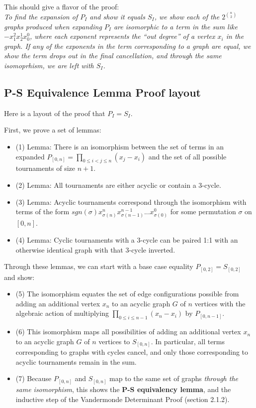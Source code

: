 \documentclass[11pt, oneside]{article} 	%
\begin{document}
This should give a flavor of the proof: 
\\
\emph{To find the expansion of $P_I$ and show it equals $S_I$, we show each of the $2^{n \choose 2}$ graphs produced when expanding $P_I$ are isomorphic to a term in the sum like $-x_1^2x_2^1x_0^0$, where each exponent represents the ``out degree'' of a vertex $x_i$ in the graph. If any of the exponents in the term corresponding to a graph are equal, we show the term drops out in the final cancellation, and through the same isomoprhism, we are left with $S_I$.}

\subsection{P-S Equivalence Lemma Proof layout}

Here is a layout of the proof that $P_I=S_I$.

First, we prove a set of lemmas:
\begin{itemize}
\item (1) Lemma: There is an isomorphism between the set of terms in an expanded $P_{[0,n]} =\prod_{0 \leq i < j \leq n}(x_j - x_i)$ and the set of all possible tournaments of size $n+1$.
\item (2) Lemma: All tournaments are either acyclic or contain a 3-cycle.
\item (3) Lemma: Acyclic tournaments correspond through the isomorphism with terms of the form $sgn(\sigma) x_{\sigma(n)}^nx_{\sigma(n-1)}^{n-1}  ... x_{\sigma(0)}^{0}$ for some permutation $\sigma$ on $[0,n]$.
\item (4) Lemma: Cyclic tournaments with a 3-cycle can be paired 1:1 with an otherwise identical graph with that 3-cycle inverted.
\end{itemize}

Through these lemmas, we can start with a base case equality $P_{[0,2]} = S_{[0,2]}$ and show:
\begin{itemize}
\item (5) The isomorphism equates the set of edge configurations possible from adding an additional vertex $x_n$ to an acyclic graph $G$ of $n$ vertices with the algebraic action of multiplying $\prod_{0 \leq i \leq n-1}(x_n-x_i)$ by $P_{[0,n-1]}$. 
\item (6) This isomorphism maps all possibilities of adding an additional vertex $x_n$ to an acyclic graph $G$ of $n$ vertices to $S_{[0,n]}$.  In particular, all terms corresponding to graphs with cycles cancel, and only those corresponding to acyclic tournaments remain in the sum.   
\item (7) Because $P_{[0,n]}$ and $S_{[0,n]}$ map to the same set of graphs \emph{through the same isomorphism}, this shows the \textbf{P-S equivalency lemma}, and the inductive step of the Vandermonde Determinant Proof (section 2.1.2).
\end{itemize}
\end{document}

